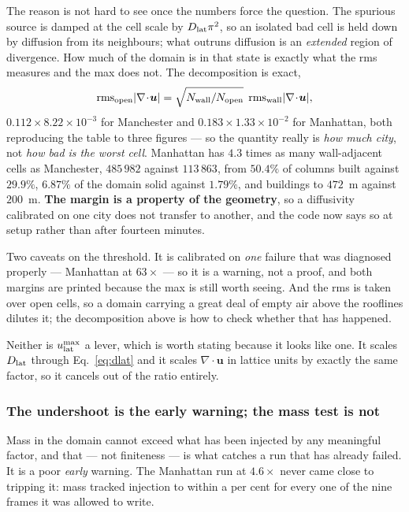 \documentclass[11pt,a4paper]{article}
\newcommand{\uu}{\bm{u}}
\begin{document}
The reason is not hard to see once the numbers force the question. The spurious
source is damped at the cell scale by $D_{\rm lat}\pi^2$, so an isolated bad cell
is held down by diffusion from its neighbours; what outruns diffusion is an
\emph{extended} region of divergence. How much of the domain is in that state is
exactly what the rms measures and the max does not. The decomposition is exact,
\begin{equation}
  \mathrm{rms}_{\rm open}|\nabla\!\cdot\!\uu|
  = \sqrt{N_{\rm wall}/N_{\rm open}}\;\,
    \mathrm{rms}_{\rm wall}|\nabla\!\cdot\!\uu|,
\end{equation}
$0.112\times8.22\times10^{-3}$ for Manchester and $0.183\times1.33\times10^{-2}$
for Manhattan, both reproducing the table to three figures --- so the quantity
really is \emph{how much city}, not \emph{how bad is the worst cell}. Manhattan
has $4.3$ times as many wall-adjacent cells as Manchester, $485\,982$ against
$113\,863$, from $50.4\%$ of columns built against $29.9\%$, $6.87\%$ of the
domain solid against $1.79\%$, and buildings to $472$~m against $200$~m.
\textbf{The margin is a property of the geometry}, so a diffusivity calibrated on
one city does not transfer to another, and the code now says so at setup rather
than after fourteen minutes.

Two caveats on the threshold. It is calibrated on \emph{one} failure that was
diagnosed properly --- Manhattan at $63\times$ --- so it is a warning, not a
proof, and both margins are printed because the max is still worth seeing. And
the rms is taken over open cells, so a domain carrying a great deal of empty air
above the rooflines dilutes it; the decomposition above is how to check whether
that has happened.

Neither is $u^{\max}_{\rm lat}$ a lever, which is worth stating because it looks
like one. It scales $D_{\rm lat}$ through Eq.~\eqref{eq:dlat} and it scales
$\nabla\!\cdot\!\uu$ in lattice units by exactly the same factor, so it cancels
out of the ratio entirely.

\subsubsection*{The undershoot is the early warning; the mass test is not}

Mass in the domain cannot exceed what has been injected by any meaningful
factor, and that --- not finiteness --- is what catches a run that has already
failed. It is a poor \emph{early} warning. The Manhattan run at $4.6\times$ never
came close to tripping it: mass tracked injection to within a per cent for
every one of the nine frames it was allowed to write.
\end{document}
